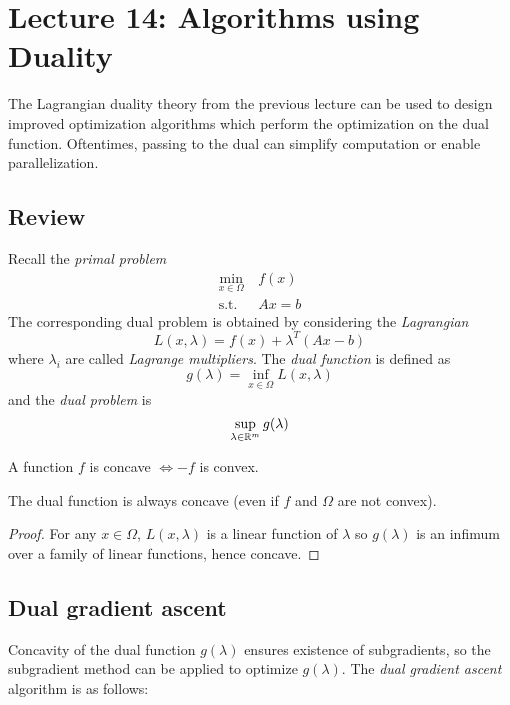 \section{Lecture 14: Algorithms using Duality}

The Lagrangian duality theory from the previous lecture can be used to
design improved optimization algorithms which perform the optimization
on the dual function. Oftentimes, passing to the dual can simplify
computation or enable parallelization.

\subsection{Review}

Recall the \emph{primal problem}
\begin{align*}
\min_{x \in \Omega}~&f(x) \\
\text{s.t.}~& A x = b
\end{align*}
The corresponding dual problem is obtained by considering the
\emph{Lagrangian}
\[
L(x,\lambda) = f(x) + \lambda^T(A x  - b)
\]
where $\lambda_i$ are called \emph{Lagrange multipliers}. The
\emph{dual function} is defined as
\[
g(\lambda) = \inf_{x \in \Omega} L(x,\lambda)
\]
and the \emph{dual problem} is
\[
\sup_{\lambda \in \mathbb{R}^m} g(\lambda)
\]

\begin{definition}
A function $f$ is concave $\iff -f$ is convex.
\end{definition}

\begin{fact}
The dual function is always concave (even if $f$ and
$\Omega$ are not convex).
\end{fact}

\begin{proof}
For any $x \in \Omega$,
$L(x,\lambda)$ is a linear function of $\lambda$ so $g(\lambda)$
is an infimum over a family of linear functions, hence concave.
\end{proof}

\subsection{Dual gradient ascent}

Concavity of the dual function $g(\lambda)$ ensures existence of
subgradients, so the subgradient method can be applied to optimize $g(\lambda)$.
The \emph{dual gradient ascent} algorithm is as follows:

